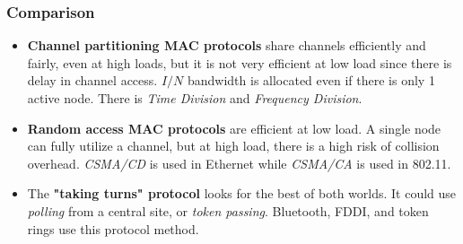 \documentclass{article}
\begin{document}
\subsubsection{Comparison}
\begin{itemize}
\item {\bf Channel partitioning MAC protocols} share channels efficiently and fairly, even at high loads, but it is not very efficient at low load since there is delay in channel access. $I/N$ bandwidth is allocated even if there is only 1 active node. There is \emph{Time Division} and \emph{Frequency Division}.
\item {\bf Random access MAC protocols} are efficient at low load. A single node can fully utilize a channel, but at high load, there is a high risk of collision overhead. \emph{CSMA/CD} is used in Ethernet while \emph{CSMA/CA} is used in 802.11.
\item The {\bf "taking turns" protocol} looks for the best of both worlds. It could use \emph{polling} from a central site, or \emph{token passing}. Bluetooth, FDDI, and token rings use this protocol method.
\end{itemize}
\end{document}
